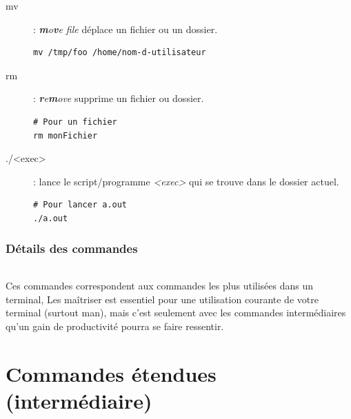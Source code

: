 \documentclass[french, a4paper, 12pt, titlepage]{article}
\begin{document}
\begin{description}
\item[mv]: \emph{\textbf{m}o\textbf{v}e file} déplace un fichier ou un dossier.

  \begin{lstlisting}
mv /tmp/foo /home/nom-d-utilisateur
  \end{lstlisting}

\item[rm]: \emph{\textbf{r}e\textbf{m}ove} supprime un fichier ou dossier.

  \begin{lstlisting}
# Pour un fichier
rm monFichier
  \end{lstlisting}

\item[./<exec>]: lance le script/programme \emph{<exec>} qui se trouve dans le
	dossier actuel.

  \begin{lstlisting}
# Pour lancer a.out
./a.out
  \end{lstlisting}

\end{description}

\section{Détails des commandes}











\vspace{7em}

\paragraph{} Ces commandes correspondent aux commandes les plus utilisées dans
un terminal,
Les maîtriser est essentiel pour une utilisation courante de votre terminal
(surtout man), mais c'est seulement avec les commandes intermédiaires qu'un
gain de productivité pourra se faire ressentir.

\newpage

\part{Commandes étendues (intermédiaire)}
\end{document}
